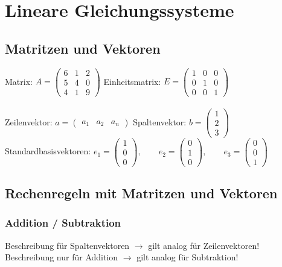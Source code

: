 \section{Lineare Gleichungssysteme}
		    \subsection{Matritzen und Vektoren}
			Matrix: $A = \begin{pmatrix}
				6&1&2\\
				5&4&0\\
				4&1&9
			\end{pmatrix}$ \qquad
			Einheitsmatrix: $E = \begin{pmatrix}
				1&0&0\\
				0&1&0\\
				0&0&1
			\end{pmatrix}$ \\
			\\
			Zeilenvektor: $a = \begin{pmatrix}
a_1&a_2&a_n \end{pmatrix}$ \quad Spaltenvektor: $b =  \begin{pmatrix} 1\\2\\3 \end{pmatrix}$ 	\\
			
			Standardbasisvektoren:  $ e_1=\begin{pmatrix}1\\0\\0\end{pmatrix},
\qquad
e_2=\begin{pmatrix}0\\1\\0\end{pmatrix},
\qquad
e_3=\begin{pmatrix}0\\0\\1\end{pmatrix}$ \\
	
				
			\subsection{Rechenregeln mit Matritzen und Vektoren}
		    \subsubsection{Addition / Subtraktion}
			Beschreibung für Spaltenvektoren $\rightarrow$ gilt analog für Zeilenvektoren! \\
			Beschreibung nur für Addition $\rightarrow$ gilt analog für Subtraktion! \\

